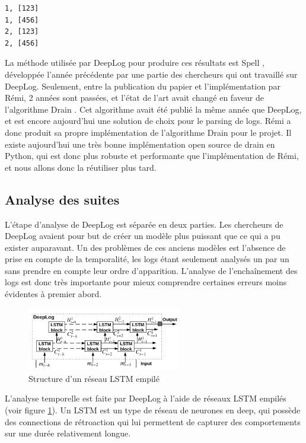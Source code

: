 \documentclass[openany, 12pt]{memoir}
\begin{document}
\begin{lstlisting}
1, [123]
1, [456]
2, [123]
2, [456]
\end{lstlisting}

La méthode utilisée par DeepLog pour produire ces résultats est Spell \cite{spell}, développée l'année précédente par une partie des chercheurs qui ont travaillé sur DeepLog. Seulement, entre la publication du papier et l'implémentation par Rémi, 2 années sont passées, et l'état de l'art avait changé en faveur de l'algorithme Drain \cite{drain}. Cet algorithme avait été publié la même année que DeepLog, et est encore aujourd'hui une solution de choix pour le parsing de \glspl{log}. Rémi a donc produit sa propre implémentation de l'algorithme Drain pour le projet. Il existe aujourd'hui une très bonne implémentation open source de drain en Python, qui est donc plus robuste et performante que l'implémentation de Rémi, et nous allons donc la réutiliser plus tard.

\subsection{Analyse des suites}

L'étape d'analyse de DeepLog est séparée en deux parties. Les chercheurs de DeepLog avaient pour but de créer un modèle plus puissant que ce qui a pu exister auparavant. Un des problèmes de ces anciens modèles est l'absence de prise en compte de la temporalité, les \glspl{log} étant seulement analysés un par un sans prendre en compte leur ordre d'apparition. L'analyse de l'enchaînement des \glspl{log} est donc très importante pour mieux comprendre certaines erreurs moins évidentes à premier abord.

\begin{figure}[ht]
	\centering
	\includegraphics[width=0.6\textwidth]{images/stacked_lstm.png}
	\caption{Structure d'un réseau \gls{LSTM} empilé}
	\label{lstm}
\end{figure}

L'analyse temporelle est faite par DeepLog à l'aide de réseaux \gls{LSTM} empilés (voir figure \ref{lstm}). Un \gls{LSTM} est un type de réseau de neurones en \gls{deep}, qui possède des connections de rétroaction qui lui permettent de capturer des comportements sur une durée relativement longue.
\end{document}

